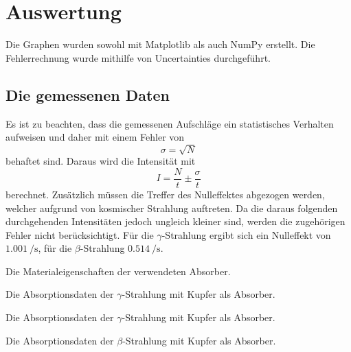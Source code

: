 \section{Auswertung}
\label{sec:Auswertung}


Die Graphen wurden sowohl mit Matplotlib \cite{matplotlib} als auch NumPy \cite{numpy} erstellt. Die
Fehlerrechnung wurde mithilfe von Uncertainties \cite{uncertainties} durchgeführt.

\subsection{Die gemessenen Daten}
Es ist zu beachten, dass die gemessenen Aufschläge ein statistisches Verhalten
aufweisen und daher mit einem Fehler von
\begin{equation}
\sigma = \sqrt{N}
\end{equation}
behaftet sind. Daraus wird die Intensität mit
\begin{equation}
  I = \frac{N}{t} \pm \frac{\sigma}{t}
\end{equation}
 berechnet. Zusätzlich müssen die Treffer des Nulleffektes abgezogen werden,
welcher aufgrund von kosmischer Strahlung auftreten. Da die daraus folgenden
durchgehenden Intensitäten jedoch ungleich kleiner sind, werden die zugehörigen
 Fehler nicht berücksichtigt. Für die $\gamma$-Strahlung ergibt sich ein
 Nulleffekt von $\SI{1.001}{\per\second}$, für die $\beta$-Strahlung $\SI{0.514}{\per\second}$.

 \begin{table}
  \centering
  \caption{Die Materialeigenschaften der verwendeten Absorber.}
  
  \label{tab:rohd}
 \end{table}

\begin{table}
 \centering
 \caption{Die Absorptionsdaten der $\gamma$-Strahlung mit Kupfer als Absorber.}
 
 \label{tab:k}
\end{table}

\begin{table}
 \centering
 \caption{Die Absorptionsdaten der $\gamma$-Strahlung mit Kupfer als Absorber.}
 
 \label{tab:e}
\end{table}

\begin{table}
 \centering
 \caption{Die Absorptionsdaten der $\beta$-Strahlung mit Kupfer als Absorber.}
 
 \label{tab:betaJ}
\end{table}

